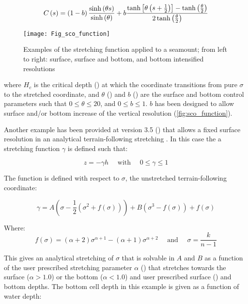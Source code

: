 \documentclass[../main/NEMO_manual]{subfiles}
\begin{document}
\[
  C\left(s\right) =   \left(1 - b \right)\frac{ \sinh\left( \theta s\right)}{\sinh\left(\theta\right)} +      \\
  b\frac{ \tanh \left[ \theta \left(s + \frac{1}{2} \right)\right] - \tanh\left(\frac{\theta}{2}\right)}{ 2\tanh\left (\frac{\theta}{2}\right)}
\]

\begin{figure}[!ht]
  \begin{center}
    \texttt{[image: Fig\_sco\_function]}
    \caption{
      \protect\label{fig:sco_function}
      Examples of the stretching function applied to a seamount;
      from left to right: surface, surface and bottom, and bottom intensified resolutions
    }
  \end{center}
\end{figure}

where $H_c$ is the critical depth () at which
the coordinate transitions from pure $\sigma$ to the stretched coordinate,
and $\theta$ () and $b$ () are the surface and bottom control parameters such that
$0\leqslant \theta \leqslant 20$, and $0\leqslant b\leqslant 1$.
$b$ has been designed to allow surface and/or bottom increase of the vertical resolution
(\autoref{fig:sco_function}).

Another example has been provided at version 3.5 () that allows a fixed surface resolution in
an analytical terrain-following stretching \citet{Siddorn_Furner_OM12}.
In this case the a stretching function $\gamma$ is defined such that:

\[
  z = -\gamma h \quad \text{ with } \quad 0 \leq \gamma \leq 1
\]

The function is defined with respect to $\sigma$, the unstretched terrain-following coordinate:

\[
  \gamma= A\left(\sigma-\frac{1}{2}\left(\sigma^{2}+f\left(\sigma\right)\right)\right)+B\left(\sigma^{3}-f\left(\sigma\right)\right)+f\left(\sigma\right)
\]

Where:
\[
  f\left(\sigma\right)=\left(\alpha+2\right)\sigma^{\alpha+1}-\left(\alpha+1\right)\sigma^{\alpha+2} \quad \text{ and } \quad \sigma = \frac{k}{n-1}
\]

This gives an analytical stretching of $\sigma$ that is solvable in $A$ and $B$ as a function of
the user prescribed stretching parameter $\alpha$ () that stretches towards
the surface ($\alpha > 1.0$) or the bottom ($\alpha < 1.0$) and
user prescribed surface () and bottom depths.
The bottom cell depth in this example is given as a function of water depth:
\end{document}
